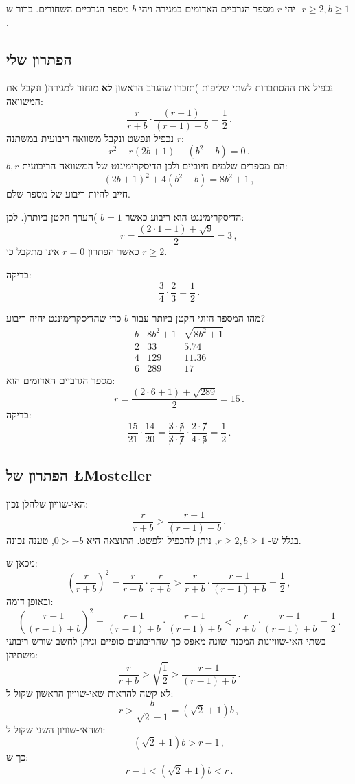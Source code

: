 \documentclass[11pt,a4paper]{article}
\newcommand*{\disfrac}[2]{\displaystyle\frac{#1}{#2}}
\begin{document}
יהי
$r$
מספר הגרביים האדומים במגירה ויהי
$b$
מספר הגרביים השחורים. ברור ש-%
$r\geq 2, b\geq 1$.

\subsection*{הפתרון שלי}

נכפיל את ההסתברות לשתי שליפות )תזכרו שהגרב הראשון
\textbf{לא}
מוחזר למגירה( ונקבל את המשוואה:
\[
\frac{r}{r+b} \cdot \frac{(r-1)}{(r-1)+b} = \frac{1}{2}\,.
\]
נכפיל ונפשט ונקבל משוואה ריבועית במשתנה 
$r$:
\[
r^2-r(2b+1)-(b^2-b)=0\,.
\]
$b,r$
הם מספרים שלמים חיוביים ולכן הדיסקרימיננט של המשוואה הריבועית:
\[
(2b+1)^2+4(b^2-b)=8b^2+1\,,
\]
חייב להיות ריבוע של מספר שלם.

הדיסקרימיננט הוא ריבוע כאשר
$b=1$
)הערך הקטן ביותר(. לכן:
\[
r= \disfrac{(2\cdot 1 + 1)+ \sqrt{9}}{2}=3\,,
\]
כאשר הפתרון 
$r=0$
אינו מתקבל כי
$r\geq 2$.

בדיקה:
\[
\disfrac{3}{4}\cdot\disfrac{2}{3}=\disfrac{1}{2}\,.
\]

\bigskip

מהו המספר הזוגי הקטן ביותר עבור 
$b$
כדי שהדיסקרימיננט יהיה ריבוע?
\begin{displaymath}
\renewcommand{\arraystretch}{1}
\begin{array}{r|r|r}
b&8b^2+1&\sqrt{8b^2+1}\\
\hline
2&33&5.74\\
4&129&11.36\\
6&289&17
\end{array}
\end{displaymath}
מספר הגרביים האדומים הוא:
\[
r=\disfrac{(2\cdot 6+1)+\sqrt{289}}{2}=15\,.
\]
בדיקה:
\[
\disfrac{15}{21}\cdot\disfrac{14}{20}=\disfrac{\not 3\cdot \not 5}{\not 3\cdot \not 7}\cdot\disfrac{2\cdot \not 7}{4\cdot \not 5}=\disfrac{1}{2}\,.
\]

\subsection*{הפתרון של 
\L{Mosteller}}

האי-שוויון שלהלן נכון:
\[
\frac{r}{r+b} > \frac{r-1}{(r-1)+b}\,.
\]
בגלל ש-%
$r\geq 2, b\geq 1$,
ניתן להכפיל ולפשט. התוצאה היא
$0>-b$,
טענה נכונה.

מכאן ש:
\[
\left(\frac{r}{r+b}\right)^2 = \frac{r}{r+b} \cdot\frac{r}{r+b} > \frac{r}{r+b} \cdot \frac{r-1}{(r-1)+b} = \frac{1}{2}\,,
\]
ובאופן דומה:
\[
\left(\frac{r-1}{(r-1)+b}\right)^2  = \frac{r-1}{(r-1)+b}\cdot \frac{r-1}{(r-1)+b}<  \frac{r}{r+b} \cdot \frac{r-1}{(r-1)+b} = \frac{1}{2}\,.
\]
בשתי האי-שוויונות המכנה שונה מאפס כך שהריבועים סופיים וניתן לחשב שורש ריבועי משתיהן:
\[
\frac{r}{r+b}  > \sqrt{\frac{1}{2}} > \frac{r-1}{(r-1)+b}  \,.
\]
לא קשה להראות שאי-שוויון הראשון שקול ל:
\[
r>\frac{b}{\sqrt{2}-1}=(\sqrt{2}+1)b\,,
\]
ושהאי-שוויון השני שקול ל:
\[
(\sqrt{2}+1)b>r-1\,,
\]
כך ש:
\[
r-1<(\sqrt{2}+1)b<r\,.
\]
\end{document}
